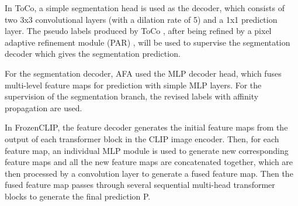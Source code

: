 In ToCo,  a simple segmentation head is used as the decoder, which consists of two 3x3 convolutional layers (with a dilation rate of 5) and a 1x1 prediction layer.  The pseudo labels produced by ToCo , after being refined by a pixel adaptive refinement module (PAR) , will be used to supervise the segmentation decoder which gives the segmentation prediction.

For the segmentation decoder, AFA used the MLP decoder head, which fuses multi-level feature maps for prediction with simple MLP layers. For the supervision of the segmentation branch, the revised labels with affinity propagation are used.

In FrozenCLIP, the feature decoder generates the initial feature maps from the output of each transformer block in the CLIP image encoder. Then, for each feature map, an individual MLP module is used to generate new corresponding feature maps and all the new feature maps are concatenated together, which are then processed by a convolution layer to generate a fused feature map. Then the fused feature map passes through several sequential multi-head transformer blocks to generate the final prediction P.
